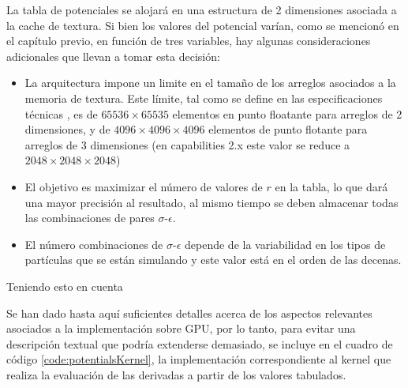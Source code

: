 La tabla de potenciales se alojará en una estructura de 2 dimensiones asociada a la cache de textura. 
Si bien los valores del potencial varían, como se mencionó en el capítulo previo, en función de tres variables, hay algunas consideraciones adicionales que llevan a tomar esta decisión:

\begin{itemize}
\item La arquitectura impone un limite en el tamaño de los arreglos asociados a la memoria de textura. 
Este límite, tal como se define en las especificaciones técnicas \cite{cudaProgrammingGuide}, es de $65536 \times 65535$ elementos en punto floatante para arreglos de 2 dimensiones, 
y de $4096 \times 4096 \times 4096$ elementos de punto flotante para arreglos de 3 dimensiones (en capabilities 2.x este valor se reduce a $2048 \times 2048 \times 2048$)


\item El objetivo es maximizar el número de valores de $r$ en la tabla, lo que dará una mayor precisión al resultado, al mismo tiempo se deben almacenar todas las combinaciones de pares $\sigma$-$\epsilon$.

\item El número combinaciones de $\sigma$-$\epsilon$ depende de la variabilidad en los tipos de partículas que se están simulando y este valor está en el orden de las decenas.

\end{itemize}

Teniendo esto en cuenta



Se han dado hasta aquí suficientes detalles acerca de los aspectos relevantes asociados a la implementación sobre GPU, por lo tanto, para evitar una descripción textual que podría extenderse demasiado, se incluye en el cuadro de código \ref{code:potentialsKernel}, 
la implementación correspondiente al kernel que realiza la evaluación de las derivadas a partir de los valores tabulados.


